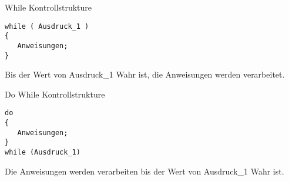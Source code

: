 \begin{myalertblock}{While Kontrollstrukture}
\begin{lstlisting}
while ( Ausdruck_1 )
{
   Anweisungen;
}
\end{lstlisting}
\vspace{-0.5cm}
Bis der Wert von Ausdruck\_1 Wahr ist, die Anweisungen werden verarbeitet.
\end{myalertblock}

\begin{myalertblock}{Do While Kontrollstrukture}
\begin{lstlisting}
do
{
   Anweisungen;
}
while (Ausdruck_1)
\end{lstlisting}
\vspace{-0.5cm}
Die Anweisungen werden verarbeiten bis der Wert von Ausdruck\_1 Wahr ist.
\end{myalertblock}

